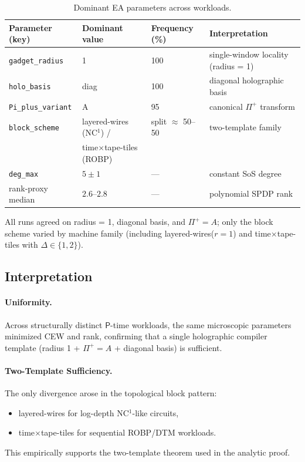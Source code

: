 \documentclass[12pt]{article}
\theoremstyle{definition}
\theoremstyle{definition}
\theoremstyle{remark}
\theoremstyle{remark}
\begin{document}
\begin{table}[h!]
\centering
\begin{tabular}{llll}
\hline
\textbf{Parameter (key)} & \textbf{Dominant value} & \textbf{Frequency (\%)} & \textbf{Interpretation} \\
\hline
\texttt{gadget\_radius} & 1 & 100 & single-window locality (radius = 1) \\
\texttt{holo\_basis} & diag & 100 & diagonal holographic basis \\
\texttt{Pi\_plus\_variant} & A & 95 & canonical $\Pi^+$ transform \\
\texttt{block\_scheme} & layered-wires (NC$^1$) / & split $\approx$ 50--50 & two-template family \\
& time$\times$tape-tiles (ROBP) & & \\
\texttt{deg\_max} & $5 \pm 1$ & --- & constant SoS degree \\
rank-proxy median & $2.6$--$2.8$ & --- & polynomial SPDP rank \\
\hline
\end{tabular}
\caption{Dominant EA parameters across workloads.}
\label{tab:ea-results-summary}
\end{table}

All runs agreed on radius = 1, diagonal basis, and $\Pi^+ = A$; only the block scheme varied by machine family (including layered-wires($r=1$) and time$\times$tape-tiles with $\Delta \in \{1,2\}$).

\subsection{Interpretation}

\paragraph{Uniformity.}
Across structurally distinct $\mathsf{P}$-time workloads, the same microscopic parameters minimized CEW and rank, confirming that a single holographic compiler template (radius 1 + $\Pi^+ = A$ + diagonal basis) is sufficient.

\paragraph{Two-Template Sufficiency.}
The only divergence arose in the topological block pattern:
\begin{itemize}
\item layered-wires for log-depth NC$^1$-like circuits,
\item time$\times$tape-tiles for sequential ROBP/DTM workloads.
\end{itemize}
This empirically supports the two-template theorem used in the analytic proof.
\end{document}
